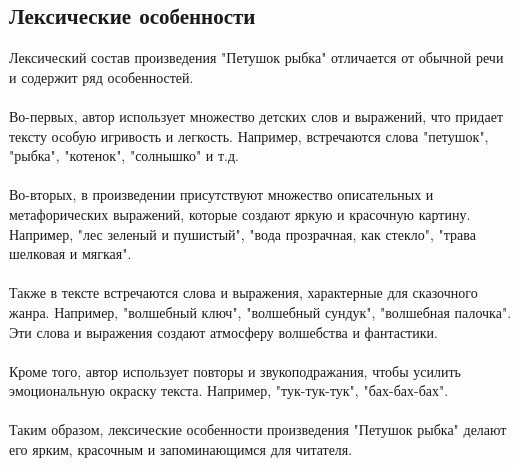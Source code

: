 \documentclass{article}
\begin{document}
\subsection{Лексические особенности}
Лексический состав произведения "{}{}Петушок рыбка"{}{} отличается от обычной речи и содержит ряд особенностей.\\
~\\
Во-первых, автор использует множество детских слов и выражений, что придает тексту особую игривость и легкость. Например, встречаются слова "{}{}петушок"{}{}, "{}{}рыбка"{}{}, "{}{}котенок"{}{}, "{}{}солнышко"{}{} и т.д.\\
~\\
Во-вторых, в произведении присутствуют множество описательных и метафорических выражений, которые создают яркую и красочную картину. Например, "{}{}лес зеленый и пушистый"{}{}, "{}{}вода прозрачная, как стекло"{}{}, "{}{}трава шелковая и мягкая"{}{}.\\
~\\
Также в тексте встречаются слова и выражения, характерные для сказочного жанра. Например, "{}{}волшебный ключ"{}{}, "{}{}волшебный сундук"{}{}, "{}{}волшебная палочка"{}{}. Эти слова и выражения создают атмосферу волшебства и фантастики.\\
~\\
Кроме того, автор использует повторы и звукоподражания, чтобы усилить эмоциональную окраску текста. Например, "{}{}тук-тук-тук"{}{}, "{}{}бах-бах-бах"{}{}.\\
~\\
Таким образом, лексические особенности произведения "{}{}Петушок рыбка"{}{} делают его ярким, красочным и запоминающимся для читателя.
\end{document}
